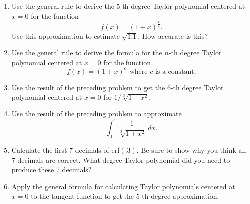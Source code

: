 \begin{enumerate}
\begin{enumerate}
  \item Show that we then have to define $2^{-3}=1/2^3$ if we are to
continue to preserve property A.

  \item Show why $2^{1/4}$ must be $\sqrt[4]{2}$.

  \item In the same way, you should convince yourself that a basic
property of the factorial notation is that $(n+1)!=(n+1)\cdot n!$ for
any positive integer~$n$.  Then show that to preserve this property,
we have to define $0!=1$.

  \item Show that there is no way to define $(-1)!$ which preserves this
property.


\end{enumerate}
\item Use the general rule to derive the 5-th degree Taylor polynomial
centered at $x=0$ for the function
\[
f(x) = (1+x)^{\frac{1}{2}}.
\]
Use this approximation to estimate $\sqrt{1.1}$. How accurate is
this?




\item Use the general rule to derive the formula for the $n$-th degree
Taylor polynomial centered at $x=0$ for the function
\[
f(x) = (1+x)^c \, \mbox{ where $c$ is a constant}.
\]


\item Use the result of the preceding problem to get the 6-th degree
Taylor polynomial centered at $x=0$ for $1/\sqrt[3]{1+x^2}$.



\item Use the result of the preceding problem to approximate
\[
\int_0^1 \dfrac{1}{\sqrt[3]{1+x^2}}\, dx.
\]


\item Calculate the first 7 decimals of erf$(.3)$. Be sure to show why
you think all 7 decimals are correct.  What degree Taylor polynomial
did you need to produce these 7 decimals?



\item Apply the general formula for calculating Taylor polynomials
centered at $x=0$ to the tangent function to get the 5-th degree
approximation.




\end{enumerate}
